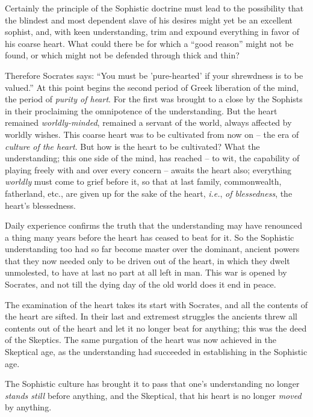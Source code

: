 \documentclass[12pt,a4paper]{book}
\begin{document}
Certainly the principle of the Sophistic doctrine must lead to the possibility 
that the blindest and most dependent slave of his desires might yet be an 
excellent sophist, and, with keen understanding, trim and expound everything 
in favor of his coarse heart. What could there be for which a ``good 
reason'' might not be found, or which might not be defended through thick and 
thin?

Therefore Socrates says: ``You must be 'pure-hearted' if your shrewdness is 
to be valued.'' At this point begins the second period of Greek liberation of 
the mind, the period of \textit{purity of heart}. For the first was brought to 
a close by the Sophists in their proclaiming the omnipotence of the 
understanding. But the heart remained \textit{worldly-minded}, remained a 
servant of the world, always affected by worldly wishes. This coarse heart was 
to be cultivated from now on -- the era of \textit{culture of the heart}. But 
how is the heart to be cultivated? What the understanding; this one side of 
the mind, has reached -- to wit, the capability of playing freely with and 
over every concern -- awaits the heart also; everything \textit{worldly} must 
come to grief before it, so that at last family, commonwealth, fatherland, 
etc., are given up for the sake of the heart, \textit{i.e.}, \textit{of 
blessedness}, the heart's blessedness.

Daily experience confirms the truth that the understanding may have renounced 
a thing many years before the heart has ceased to beat for it. So the 
Sophistic understanding too had so far become master over the dominant, 
ancient powers that they now needed only to be driven out of the heart, in 
which they dwelt unmolested, to have at last no part at all left in man. This 
war is opened by Socrates, and not till the dying day of the old world does it 
end in peace.

The examination of the heart takes its start with Socrates, and all the 
contents of the heart are sifted. In their last and extremest struggles the 
ancients threw all contents out of the heart and let it no longer beat for 
anything; this was the deed of the Skeptics. The same purgation of the heart 
was now achieved in the Skeptical age, as the understanding had succeeded in 
establishing in the Sophistic age.

The Sophistic culture has brought it to pass that one's understanding no 
longer \textit{stands still} before anything, and the Skeptical, that his 
heart is no longer \textit{moved} by anything.
\end{document}
